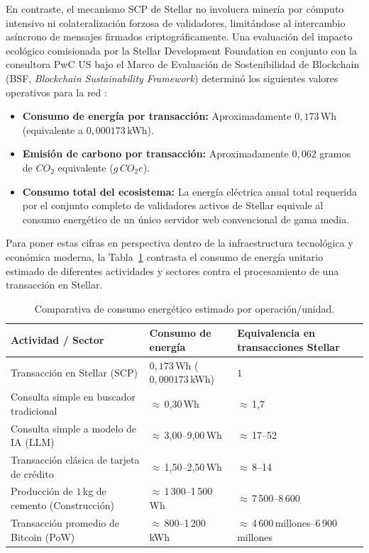 En contraste, el mecanismo SCP de Stellar no involucra minería por cómputo intensivo ni colateralización
forzosa de validadores, 
limitándose al intercambio asíncrono de mensajes firmados criptográficamente. Una evaluación del impacto
ecológico comisionada 
por la Stellar Development Foundation en conjunto con la consultora PwC US bajo el Marco de Evaluación de
Sostenibilidad de 
Blockchain (BSF, \textit{Blockchain Sustainability Framework}) determinó los siguientes valores operativos
para la red 
\cite{sdf2024sustainability}:

\begin{itemize}
    \item \textbf{Consumo de energía por transacción:} Aproximadamente $0{,}173$\,Wh (equivalente a
$0{,}000173$\,kWh).
    \item \textbf{Emisión de carbono por transacción:} Aproximadamente $0{,}062$ gramos de $CO_2$ equivalente
($g\,CO_2e$).
    \item \textbf{Consumo total del ecosistema:} La energía eléctrica anual total requerida por el conjunto
completo de validadores activos de Stellar equivale al consumo energético de un único servidor web
convencional de gama media.
\end{itemize}

Para poner estas cifras en perspectiva dentro de la infraestructura tecnológica y económica moderna, la
Tabla~\ref{tab:sostenibilidad} 
contrasta el consumo de energía unitario estimado de diferentes actividades y sectores contra el
procesamiento de una transacción 
en Stellar.

\begin{table}[H]
\centering
\small
\renewcommand{\arraystretch}{1.3}
\caption{Comparativa de consumo energético estimado por operación/unidad.}
\label{tab:sostenibilidad}
\begin{tabularx}{\textwidth}{>{\raggedright\arraybackslash}p{6.0cm} >{\raggedright\arraybackslash}p{3.5cm}
>{\raggedright\arraybackslash}X}
\toprule
\rowcolor{rowgray}
\textbf{Actividad / Sector} & \textbf{Consumo de energía} & \textbf{Equivalencia en transacciones Stellar} \\
\midrule
Transacción en Stellar (SCP) & $0{,}173$\,Wh ($0{,}000173$\,kWh) & $1$ \\
\rowcolor{rowgray}
Consulta simple en buscador tradicional & $\approx$\,0{,}30\,Wh & $\approx$\,1{,}7 \\
Consulta simple a modelo de IA (LLM) & $\approx$\,3{,}00--9{,}00\,Wh & $\approx$\,17--52
\cite{iea2024electricity} \\
\rowcolor{rowgray}
Transacción clásica de tarjeta de crédito & $\approx$\,1{,}50--2{,}50\,Wh & $\approx$\,8--14 \\
Producción de $1$\,kg de cemento (Construcción) & $\approx$\,1\,300--1\,500\,Wh & $\approx$\,7\,500--8\,600 \\
\rowcolor{rowgray}
Transacción promedio de Bitcoin (PoW) & $\approx$\,800--1\,200\,kWh &
$\approx$\,4\,600\,millones--6\,900\,millones \cite{cbeci2024bitcoin} \\
\bottomrule
\end{tabularx}
\end{table}

